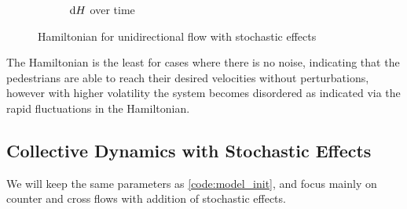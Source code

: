 \begin{itemize}
\begin{figure}[H]
\begin{subfigure}{.49\textwidth}
            \caption{$\mathrm d H$ over time}
            \label{plot:stoc_uni_dh}
        \end{subfigure}
        \caption{Hamiltonian for unidirectional flow with stochastic effects}
        \label{plot:stoc_uni_hamiltonian}
    \end{figure}

The Hamiltonian is the least for cases where there is no noise, indicating that the pedestrians are able to reach their desired velocities without perturbations, however with higher volatility the system becomes disordered as indicated via the rapid fluctuations in the Hamiltonian.

\end{itemize}



\subsection{Collective Dynamics with Stochastic Effects}
We will keep the same parameters as \autoref{code:model_init}, and focus mainly on counter and cross flows with addition of stochastic effects.

